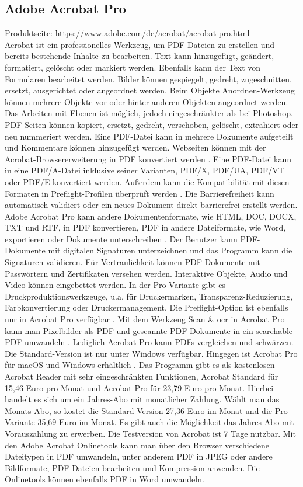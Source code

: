 \subsection{Adobe Acrobat Pro}
Produktseite: \url{https://www.adobe.com/de/acrobat/acrobat-pro.html} \\
Acrobat ist ein professionelles Werkzeug, um PDF-Dateien zu erstellen und bereits bestehende Inhalte zu bearbeiten. Text kann hinzugefügt, geändert, formatiert, gelöscht oder markiert werden. Ebenfalls kann der Text von Formularen bearbeitet werden. Bilder können gespiegelt, gedreht, zugeschnitten, ersetzt, ausgerichtet oder angeordnet werden. Beim Objekte Anordnen-Werkzeug können mehrere Objekte vor oder hinter anderen Objekten angeordnet werden. Das Arbeiten mit Ebenen ist möglich, jedoch eingeschränkter als bei Photoshop. PDF-Seiten können kopiert, ersetzt, gedreht, verschoben, gelöscht, extrahiert oder neu nummeriert werden. Eine PDF-Datei kann in mehrere Dokumente aufgeteilt und Kommentare können hinzugefügt werden. Webseiten können mit der Acrobat-Browsererweiterung in PDF konvertiert werden \cite{adobe-acrobat-um}. Eine PDF-Datei kann in eine PDF/A-Datei inklusive seiner Varianten, PDF/X, PDF/UA, PDF/VT oder PDF/E konvertiert werden. Außerdem kann die Kompatibilität mit diesen Formaten in Preflight-Profilen überprüft werden \cite{adobe-pdf-a}. Die Barrierefreiheit kann automatisch validiert oder ein neues Dokument direkt barrierefrei erstellt werden. Adobe Acrobat Pro kann andere Dokumentenformate, wie HTML, DOC, DOCX, TXT und RTF, in PDF konvertieren, PDF in andere Dateiformate, wie Word, exportieren oder Dokumente unterschreiben \cite{adobe-formate}. Der Benutzer kann PDF-Dokumente mit digitalen Signaturen unterzeichnen und das Programm kann die Signaturen validieren. Für Vertraulichkeit können PDF-Dokumente mit Passwörtern und Zertifikaten versehen werden. Interaktive Objekte, Audio und Video können eingebettet werden. In der Pro-Variante gibt es Druckproduktionswerkzeuge, u.a. für Druckermarken, Transparenz-Reduzierung, Farbkonvertierung oder Druckermanagement. Die Preflight-Option ist ebenfalls nur in Acrobat Pro verfügbar \cite{adobe-acrobat-um}. Mit dem Werkzeug Scan \& \gls{ocr} in Acrobat Pro kann man Pixelbilder als PDF und gescannte PDF-Dokumente in ein searchable PDF umwandeln \cite{adobe-search}. Lediglich Acrobat Pro kann PDFs vergleichen und schwärzen. Die Standard-Version ist nur unter Windows verfügbar. Hingegen ist Acrobat Pro für macOS und Windows erhältlich \cite{wondershare-acrobat}. Das Programm gibt es als kostenlosen Acrobat Reader mit sehr eingeschränkten Funktionen, Acrobat Standard für 15,46 Euro pro Monat und Acrobat Pro für 23,79 Euro pro Monat. Hierbei handelt es sich um ein Jahres-Abo mit monatlicher Zahlung. Wählt man das Monats-Abo, so kostet die Standard-Version 27,36 Euro im Monat und die Pro-Variante 35,69 Euro im Monat. Es gibt auch die Möglichkeit das Jahres-Abo mit Vorauszahlung zu erwerben. Die Testversion von Acrobat ist 7 Tage nutzbar. Mit den Adobe Acrobat Onlinetools kann man über den Browser verschiedene Dateitypen in PDF umwandeln, unter anderem PDF in JPEG oder andere Bildformate, PDF Dateien bearbeiten und Kompression anwenden. Die Onlinetools können ebenfalls PDF in Word umwandeln. 